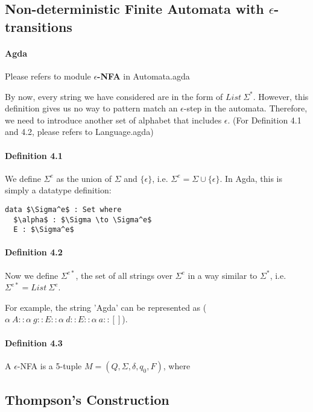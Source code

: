 \documentclass[twoside,openright,final]{bhamthesis}
\begin{document}
\subsection{Non-deterministic Finite Automata with
  \(\epsilon\)-transitions}
\paragraph{Agda} Please refers to module \textbf{\(\epsilon\)-NFA} in
Automata.agda \\

\par By now, every string we have considered are in the form of
\(List\ \Sigma^*\). However, this definition gives us no way to pattern match
an \(\epsilon\)-step in the automata. Therefore, we need to introduce another
set of alphabet that includes \(\epsilon\). (For Definition 4.1 and
4.2, please refers to Language.agda)

\paragraph{Definition 4.1} We define \(\Sigma^e\) as the union of
\(\Sigma\) and \(\{\epsilon\}\), i.e. \(\Sigma^e = \Sigma \cup
\{\epsilon\}\). In Agda, this is simply a datatype definition:
\begin{lstlisting}[mathescape=true,xleftmargin=.4\textwidth,aboveskip=0pt,belowskip=0pt]
data $\Sigma^e$ : Set where
  $\alpha$ : $\Sigma \to \Sigma^e$
  E : $\Sigma^e$
\end{lstlisting}

\paragraph{Definition 4.2} Now we define \(\Sigma^{e*}\), the set of all strings over
\(\Sigma^e\) in a way similar to \(\Sigma^*\), i.e. \(\Sigma^{e*} =
List\ \Sigma^e\). 

\par For example, the string 'Agda' can be
represented as (\(\alpha\ A :: \alpha\ g :: E :: \alpha\ d :: E :: \alpha\
a :: []\)). 

\paragraph{Definition 4.3} A \(\epsilon\)-NFA is a 5-tuple \(M = (Q ,
\Sigma, \delta, q_0, F)\), where

\subsection{Thompson's Construction}
\end{document}
